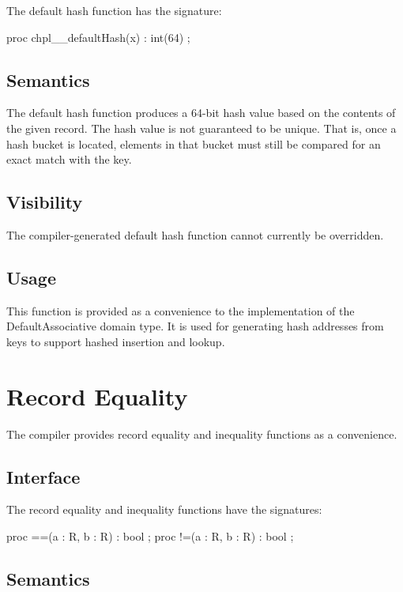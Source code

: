 The default hash function has the signature:
\begin{chapel}
proc chpl__defaultHash(x) : int(64) ;
\end{chapel}

\subsection{Semantics}

The default hash function produces a 64-bit hash value based on the contents of the given
record.  The hash value is not guaranteed to be unique.  That is, once a hash bucket is
located, elements in that bucket must still be compared for an exact match with the key.

\subsection{Visibility}

The compiler-generated default hash function cannot currently be overridden.

\subsection{Usage}

This function is provided as a convenience to the implementation of the DefaultAssociative
domain type.  It is used for generating hash addresses from keys to support hashed
insertion and lookup.


\section{Record Equality}

The compiler provides record equality \chpl{==} and inequality \chpl{!=} functions as a
convenience.

\subsection{Interface}

The record equality and inequality functions have the signatures:
\begin{chapel}
proc ==(a : R, b : R) : bool ;
proc !=(a : R, b : R) : bool ;
\end{chapel}

\subsection{Semantics}

